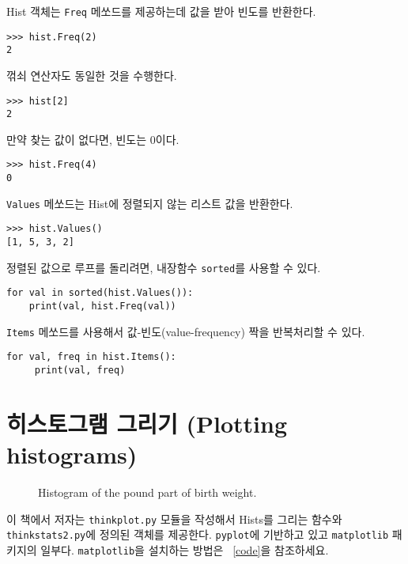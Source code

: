 Hist 객체는 {\tt Freq} 메쏘드를 제공하는데 값을 받아 빈도를 반환한다.

%
\begin{verbatim}
>>> hist.Freq(2)
2
\end{verbatim}

꺾쇠 연산자도 동일한 것을 수행한다.

%
\begin{verbatim}
>>> hist[2]
2
\end{verbatim}

만약 찾는 값이 없다면, 빈도는 0이다.

%
\begin{verbatim}
>>> hist.Freq(4)
0
\end{verbatim}

{\tt Values} 메쏘드는 Hist에 정렬되지 않는 리스트 값을 반환한다.
%
\begin{verbatim}
>>> hist.Values()
[1, 5, 3, 2]
\end{verbatim}

정렬된 값으로 루프를 돌리려면, 내장함수 {\tt sorted}를 사용할 수 있다.

%
\begin{verbatim}
for val in sorted(hist.Values()):
    print(val, hist.Freq(val))
\end{verbatim}

{\tt Items} 메쏘드를 사용해서 값-빈도(value-frequency) 짝을 반복처리할 수 있다.

%
\begin{verbatim}
for val, freq in hist.Items():
     print(val, freq)
\end{verbatim}


\section{히스토그램 그리기 (Plotting histograms)}

\begin{figure}
\caption{Histogram of the pound part of birth weight.}
\label{first_wgt_lb_hist}
\end{figure}

이 책에서 저자는 {\tt thinkplot.py} 모듈을 작성해서 Hists를 그리는 함수와 
{\tt thinkstats2.py}에 정의된 객체를 제공한다. {\tt pyplot}에 기반하고 있고 
{\tt matplotlib} 패키지의 일부다. 
{\tt matplotlib}을 설치하는 방법은 ~\ref{code}을 참조하세요.

